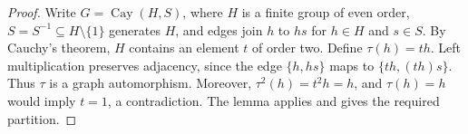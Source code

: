 \documentclass[11pt,a4paper]{article}
\begin{document}
\begin{proof}
Write $G=\operatorname{Cay}(H,S)$, where $H$ is a finite group of even
order, $S=S^{-1}\subseteq H\setminus\{1\}$ generates $H$, and edges
join $h$ to $hs$ for $h\in H$ and $s\in S$.
By Cauchy's theorem, $H$ contains an element $t$ of order two.
Define $\tau(h)=th$. Left multiplication preserves adjacency, since
the edge $\{h,hs\}$ maps to $\{th,(th)s\}$. Thus $\tau$ is a graph
automorphism. Moreover, $\tau^2(h)=t^2h=h$, and $\tau(h)=h$ would imply
$t=1$, a contradiction. The lemma applies and gives the required
partition.
\end{proof}
\end{document}

